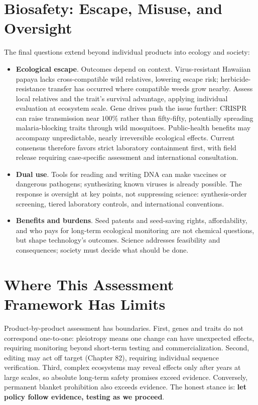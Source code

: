 \section{Biosafety: Escape, Misuse, and Oversight}

The final questions extend beyond individual products into ecology and society:

\begin{itemize}[itemsep=2pt]
\item \textbf{Ecological escape}. Outcomes depend on context. Virus-resistant Hawaiian papaya lacks cross-compatible wild relatives, lowering escape risk; herbicide-resistance transfer has occurred where compatible weeds grow nearby. Assess local relatives and the trait's survival advantage, applying individual evaluation at ecosystem scale. Gene drives push the issue further: CRISPR can raise transmission near $100\%$ rather than fifty-fifty, potentially spreading malaria-blocking traits through wild mosquitoes. Public-health benefits may accompany unpredictable, nearly irreversible ecological effects. Current consensus therefore favors strict laboratory containment first, with field release requiring case-specific assessment and international consultation.
\item \textbf{Dual use}. Tools for reading and writing DNA can make vaccines or dangerous pathogens; synthesizing known viruses is already possible. The response is oversight at key points, not suppressing science: synthesis-order screening, tiered laboratory controls, and international conventions.
\item \textbf{Benefits and burdens}. Seed patents and seed-saving rights, affordability, and who pays for long-term ecological monitoring are not chemical questions, but shape technology's outcomes. Science addresses feasibility and consequences; society must decide what should be done.
\end{itemize}

\section{Where This Assessment Framework Has Limits}

Product-by-product assessment has boundaries. First, genes and traits do not correspond one-to-one: pleiotropy means one change can have unexpected effects, requiring monitoring beyond short-term testing and commercialization. Second, editing may act off target (Chapter 82), requiring individual sequence verification. Third, complex ecosystems may reveal effects only after years at large scales, so absolute long-term safety promises exceed evidence. Conversely, permanent blanket prohibition also exceeds evidence. The honest stance is: \textbf{let policy follow evidence, testing as we proceed}.

